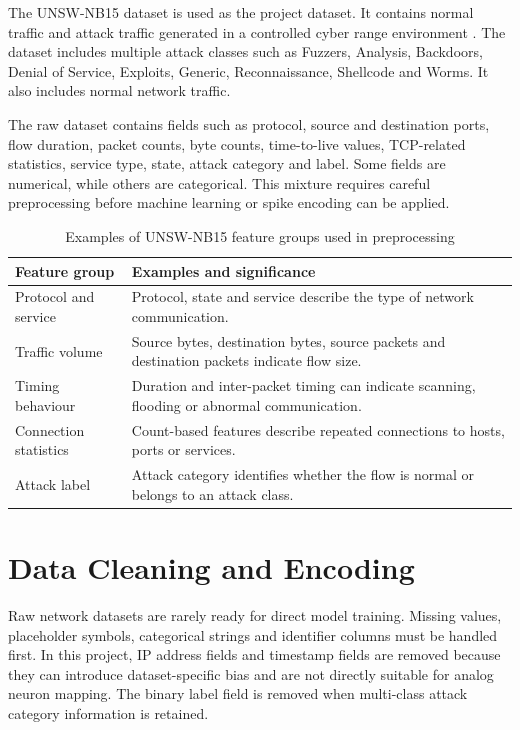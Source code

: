 The UNSW-NB15 dataset is used as the project dataset. It contains normal traffic and attack traffic generated in a controlled cyber range environment \cite{Moustafa2015}. The dataset includes multiple attack classes such as Fuzzers, Analysis, Backdoors, Denial of Service, Exploits, Generic, Reconnaissance, Shellcode and Worms. It also includes normal network traffic.

The raw dataset contains fields such as protocol, source and destination ports, flow duration, packet counts, byte counts, time-to-live values, TCP-related statistics, service type, state, attack category and label. Some fields are numerical, while others are categorical. This mixture requires careful preprocessing before machine learning or spike encoding can be applied.

\begin{table}[H]
\centering
\caption{Examples of UNSW-NB15 feature groups used in preprocessing}
\label{tab:featuregroups}
\begin{tabular}{|p{}|p{}|}
\hline
\textbf{Feature group} & \textbf{Examples and significance} \\
\hline
Protocol and service & Protocol, state and service describe the type of network communication. \\
\hline
Traffic volume & Source bytes, destination bytes, source packets and destination packets indicate flow size. \\
\hline
Timing behaviour & Duration and inter-packet timing can indicate scanning, flooding or abnormal communication. \\
\hline
Connection statistics & Count-based features describe repeated connections to hosts, ports or services. \\
\hline
Attack label & Attack category identifies whether the flow is normal or belongs to an attack class. \\
\hline
\end{tabular}
\end{table}

\section{Data Cleaning and Encoding}

Raw network datasets are rarely ready for direct model training. Missing values, placeholder symbols, categorical strings and identifier columns must be handled first. In this project, IP address fields and timestamp fields are removed because they can introduce dataset-specific bias and are not directly suitable for analog neuron mapping. The binary label field is removed when multi-class attack category information is retained.

